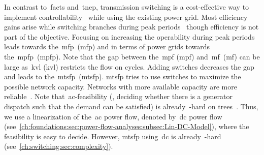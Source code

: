 In contrast to~\gls{facts} and~\gls{tnep}, transmission switching is a
cost-effective way to implement controllability~\parencite{7764210} while using
the existing power grid. Most efficiency gains arise while switching branches
during peak periods~\parencite{6069831} though efficiency is not part of the
objective.
% 
Focusing on increasing the operability during peak periods leads towards
the~\acrlong{mfp}~(\gls{mfp}) and in terms of power grids towards
the~\acrlong{mpfp}~(\gls{mpfp}). Note that the gap between the~\acrlong{mpf}
(\gls{mpf}) and~\acrlong{mf}~(\gls{mf}) can be large as~\acrlong{kvl}
(\gls{kvl}) restricts the flow on cycles. Adding switches decreases the gap and
leads to the~\acrlong{mtsfp}~(\gls{mtsfp}).
\gls{mtsfp} tries to use switches to maximize the possible network capacity.
Networks with more available capacity are more
reliable~\parencite{hedman2010optimal}.
% 
Note that~\gls{ac}-feasibility (\ie, deciding whether there is a generator
dispatch such that the demand can be satisfied) is already~\NP-hard on
trees~\parencite{Leh16}. Thus, we use a linearization of the~\gls{ac} power
flow, denoted by~\gls{dc} power flow
(see~\cref{ch:foundations:sec:power-flow-analyses:subsec:Lin-DC-Model}), where
the feasibility is easy to decide. However, \gls{mtsfp} using~\gls{dc} is
% 
already~\NP-hard (see~\cref{ch:switching:sec:complexity}).
% 
